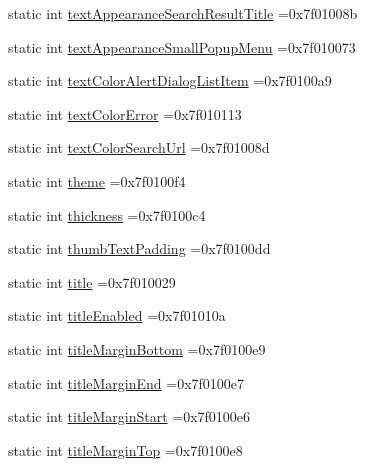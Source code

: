 \begin{DoxyCompactItemize}
\item 
static int \hyperlink{classandroid_1_1support_1_1v7_1_1appcompat_1_1R_1_1attr_a43ccbb8c59728fcd3080051a85e6f970}{text\+Appearance\+Search\+Result\+Title} =0x7f01008b
\item 
static int \hyperlink{classandroid_1_1support_1_1v7_1_1appcompat_1_1R_1_1attr_aac7d2624167851427132ba8fa60937f5}{text\+Appearance\+Small\+Popup\+Menu} =0x7f010073
\item 
static int \hyperlink{classandroid_1_1support_1_1v7_1_1appcompat_1_1R_1_1attr_acf3e75d2d1ef8b122de63bc41fbd2edb}{text\+Color\+Alert\+Dialog\+List\+Item} =0x7f0100a9
\item 
static int \hyperlink{classandroid_1_1support_1_1v7_1_1appcompat_1_1R_1_1attr_abd277e699c01cd80ea57d1e4e881df22}{text\+Color\+Error} =0x7f010113
\item 
static int \hyperlink{classandroid_1_1support_1_1v7_1_1appcompat_1_1R_1_1attr_a05d18409c9b5b41fbde88ff790d081d2}{text\+Color\+Search\+Url} =0x7f01008d
\item 
static int \hyperlink{classandroid_1_1support_1_1v7_1_1appcompat_1_1R_1_1attr_a5f9d0e2c4bd6328154d79803aa7c78b6}{theme} =0x7f0100f4
\item 
static int \hyperlink{classandroid_1_1support_1_1v7_1_1appcompat_1_1R_1_1attr_ac3b33a84f49379c0a08a95d40b284a88}{thickness} =0x7f0100c4
\item 
static int \hyperlink{classandroid_1_1support_1_1v7_1_1appcompat_1_1R_1_1attr_a9e2343866e46c4e63f8d38f7f54cfbf5}{thumb\+Text\+Padding} =0x7f0100dd
\item 
static int \hyperlink{classandroid_1_1support_1_1v7_1_1appcompat_1_1R_1_1attr_a030356582065eaa1afdf1e3e37509b4c}{title} =0x7f010029
\item 
static int \hyperlink{classandroid_1_1support_1_1v7_1_1appcompat_1_1R_1_1attr_ae7b9611359d9bc4c48118853cd058182}{title\+Enabled} =0x7f01010a
\item 
static int \hyperlink{classandroid_1_1support_1_1v7_1_1appcompat_1_1R_1_1attr_a04440642e436aae11b89705695772631}{title\+Margin\+Bottom} =0x7f0100e9
\item 
static int \hyperlink{classandroid_1_1support_1_1v7_1_1appcompat_1_1R_1_1attr_a4bfe0ae1fc33a1dcc037e2c098be342c}{title\+Margin\+End} =0x7f0100e7
\item 
static int \hyperlink{classandroid_1_1support_1_1v7_1_1appcompat_1_1R_1_1attr_adffd0131a9232a46d35e844631b0f817}{title\+Margin\+Start} =0x7f0100e6
\item 
static int \hyperlink{classandroid_1_1support_1_1v7_1_1appcompat_1_1R_1_1attr_a73f7b3964dcf1c57c0aae23104349f19}{title\+Margin\+Top} =0x7f0100e8

\end{DoxyCompactItemize}
